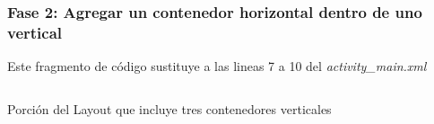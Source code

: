 \begin{frame}[fragile]
\frametitle{Fase 2: Agregar un contenedor horizontal dentro de uno vertical} 
Este fragmento de c\'odigo sustituye a las lineas 7 a 10 del \textit{activity\_main.xml}
\begin{columns}
\begin{block}{Porci\'on del Layout que incluye tres contenedores verticales}
\inputminted[linenos,fontsize=\tiny]{xml}{00_CambiosInterfaz/Layout_Fase2.xml}
\end{block}
%
\begin{center}

\end{center}
\end{columns}
\end{frame}
